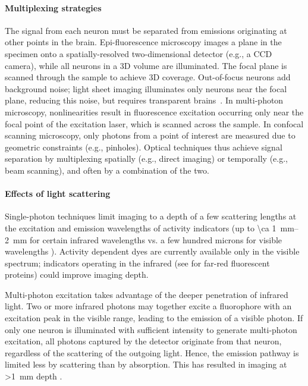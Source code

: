 \paragraph{Multiplexing strategies}
The signal from each neuron must be separated from emissions originating at other points in the brain.
Epi-fluorescence microscopy images a plane in the specimen onto a spatially-resolved two-dimensional detector (e.g., a CCD camera), while all neurons in a 3D volume are illuminated. The focal plane is scanned through the sample to achieve 3D coverage. Out-of-focus neurons add background noise; light sheet imaging illuminates only neurons near the focal plane, reducing this noise, but requires transparent brains~\cite{ahrens13}.
In multi-photon microscopy, nonlinearities result in fluorescence excitation occurring only near the focal point of the excitation laser, which is scanned across the sample.
In confocal scanning microscopy, only photons from a point of interest are measured due to geometric constraints (e.g., pinholes).
Optical techniques thus achieve signal separation by multiplexing spatially (e.g., direct imaging) or temporally (e.g., beam scanning), and often by a combination of the two.

\paragraph{Effects of light scattering}
Single-photon techniques limit imaging to a depth of a few scattering lengths at the excitation and emission wavelengths of activity indicators (up to \SIrange{\ca 1}{2}{\milli\meter} for certain infrared wavelengths \cite{horton13,kobat09,Kobat2011} vs. a few hundred microns for visible wavelengths \cite{Wilt2009}).
Activity dependent dyes are currently available only in the visible spectrum; indicators operating in the infrared (see \cite{filonov11,shcherbakova13, Shcherbo2009} for far-red fluorescent proteins) could improve imaging depth.

Multi-photon excitation takes advantage of the deeper penetration of infrared light.
Two or more infrared photons may together excite a fluorophore with an excitation peak in the visible range, leading to the emission of a visible photon.
If only one neuron is illuminated with sufficient intensity to generate multi-photon excitation, all photons captured by the detector originate from that neuron, regardless of the scattering of the outgoing light. Hence, the emission pathway is limited less by scattering than by absorption.
This has resulted in imaging at \SI{>1}{\milli\meter} depth \cite{horton13,kobat09, Kobat2011}.

